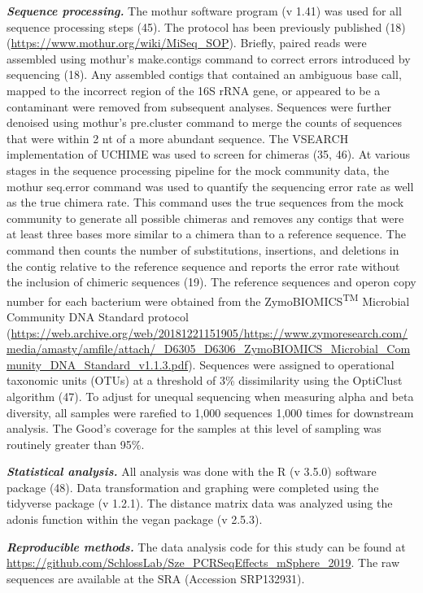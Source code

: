 \documentclass[11pt,]{article}
\begin{document}
\textbf{\emph{Sequence processing.}} The mothur software program (v
1.41) was used for all sequence processing steps (45). The protocol has
been previously published (18)
(\url{https://www.mothur.org/wiki/MiSeq_SOP}). Briefly, paired reads
were assembled using mothur's make.contigs command to correct errors
introduced by sequencing (18). Any assembled contigs that contained an
ambiguous base call, mapped to the incorrect region of the 16S rRNA
gene, or appeared to be a contaminant were removed from subsequent
analyses. Sequences were further denoised using mothur's pre.cluster
command to merge the counts of sequences that were within 2 nt of a more
abundant sequence. The VSEARCH implementation of UCHIME was used to
screen for chimeras (35, 46). At various stages in the sequence
processing pipeline for the mock community data, the mothur seq.error
command was used to quantify the sequencing error rate as well as the
true chimera rate. This command uses the true sequences from the mock
community to generate all possible chimeras and removes any contigs that
were at least three bases more similar to a chimera than to a reference
sequence. The command then counts the number of substitutions,
insertions, and deletions in the contig relative to the reference
sequence and reports the error rate without the inclusion of chimeric
sequences (19). The reference sequences and operon copy number for each
bacterium were obtained from the ZymoBIOMICS\textsuperscript{TM}
Microbial Community DNA Standard protocol
(\url{https://web.archive.org/web/20181221151905/https://www.zymoresearch.com/media/amasty/amfile/attach/_D6305_D6306_ZymoBIOMICS_Microbial_Community_DNA_Standard_v1.1.3.pdf}).
Sequences were assigned to operational taxonomic units (OTUs) at a
threshold of 3\% dissimilarity using the OptiClust algorithm (47). To
adjust for unequal sequencing when measuring alpha and beta diversity,
all samples were rarefied to 1,000 sequences 1,000 times for downstream
analysis. The Good's coverage for the samples at this level of sampling
was routinely greater than 95\%.

\textbf{\emph{Statistical analysis.}} All analysis was done with the R
(v 3.5.0) software package (48). Data transformation and graphing were
completed using the tidyverse package (v 1.2.1). The distance matrix
data was analyzed using the adonis function within the vegan package (v
2.5.3).

\textbf{\emph{Reproducible methods.}} The data analysis code for this
study can be found at
\url{https://github.com/SchlossLab/Sze_PCRSeqEffects_mSphere_2019}. The
raw sequences are available at the SRA (Accession SRP132931).
\end{document}
